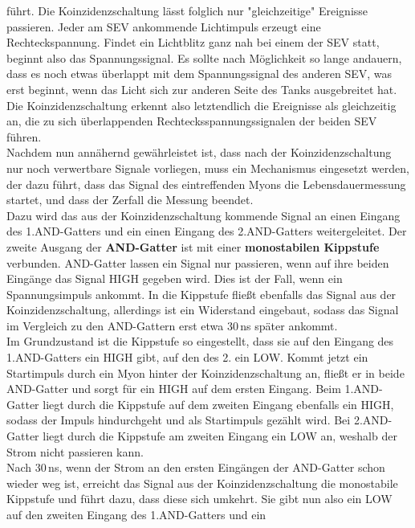     führt. Die Koinzidenzschaltung lässt folglich nur
    "gleichzeitige" Ereignisse passieren.
    Jeder am SEV ankommende Lichtimpuls erzeugt eine Rechteckspannung.
    Findet ein Lichtblitz ganz nah bei einem der SEV statt, beginnt
    also das Spannungssignal. Es sollte nach Möglichkeit so lange
    andauern, dass es noch etwas überlappt mit dem Spannungssignal des anderen
    SEV, was erst beginnt, wenn das Licht sich zur anderen
    Seite des Tanks ausgebreitet hat.
    Die Koinzidenzschaltung erkennt also letztendlich die Ereignisse
    als gleichzeitig an, die zu sich überlappenden Rechtecksspannungssignalen
    der beiden SEV führen.\\
    Nachdem nun annähernd gewährleistet ist, dass nach der Koinzidenzschaltung
    nur noch verwertbare Signale vorliegen, muss ein Mechanismus eingesetzt
    werden, der dazu führt, dass das Signal des eintreffenden Myons die
    Lebensdauermessung startet, und dass der Zerfall die Messung beendet. \\
    Dazu wird das aus der Koinzidenzschaltung kommende Signal an einen Eingang
    des 1.AND-Gatters und ein einen Eingang des 2.AND-Gatters weitergeleitet.
    Der zweite Ausgang der \textbf{AND-Gatter} ist mit einer
    \textbf{monostabilen
    Kippstufe} verbunden.
    AND-Gatter lassen ein Signal nur passieren, wenn auf ihre beiden
    Eingänge das Signal HIGH gegeben wird. Dies ist der Fall, wenn ein Spannungsimpuls
    ankommt.
    In die Kippstufe fließt ebenfalls das Signal aus der Koinzidenzschaltung, allerdings
    ist ein Widerstand eingebaut, sodass das Signal im Vergleich zu den AND-Gattern
    erst etwa 30\,ns später ankommt.\\
    Im Grundzustand ist die Kippstufe so eingestellt, dass sie auf den Eingang
    des 1.AND-Gatters ein HIGH gibt, auf den des 2. ein LOW.
    Kommt jetzt ein Startimpuls durch ein Myon hinter der Koinzidenzschaltung
    an, fließt er in beide AND-Gatter und sorgt für ein HIGH auf dem ersten
    Eingang. Beim 1.AND-Gatter liegt durch die Kippstufe auf dem zweiten
    Eingang ebenfalls ein HIGH, sodass der Impuls hindurchgeht und
    als Startimpuls gezählt wird.
    Bei 2.AND-Gatter liegt durch die Kippstufe am zweiten Eingang ein LOW an,
    weshalb der Strom nicht passieren kann.\\
    Nach 30\,ns, wenn der Strom an den ersten Eingängen der AND-Gatter
    schon wieder weg ist, erreicht das Signal aus der Koinzidenzschaltung
    die monostabile Kippstufe und führt dazu, dass diese sich umkehrt.
    Sie gibt nun also ein LOW auf den zweiten Eingang des 1.AND-Gatters und ein
